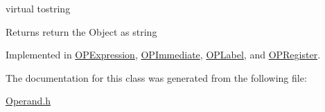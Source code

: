 virtual tostring \begin{DoxyReturn}{Returns}
return the Object as string 
\end{DoxyReturn}


Implemented in \hyperlink{classOPExpression_a0a6ee03eb083791028eeae021f4ff47b}{OPExpression}, \hyperlink{classOPImmediate_a12bc613de3bff73ead8632dafd8050a0}{OPImmediate}, \hyperlink{classOPLabel_a51c4e8f45422f03edcb71d472cf5e973}{OPLabel}, and \hyperlink{classOPRegister_a9f55bdff75224fb18973a9e913a4022f}{OPRegister}.

The documentation for this class was generated from the following file:\begin{DoxyCompactItemize}
\item 
\hyperlink{Operand_8h}{Operand.h}\end{DoxyCompactItemize}
